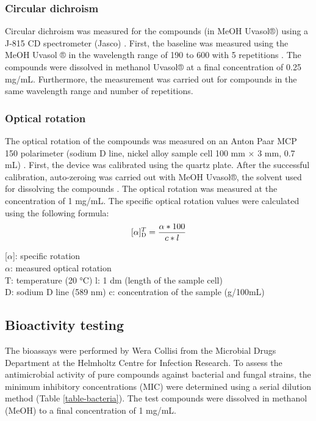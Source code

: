 \subsubsection{Circular dichroism}
Circular dichroism was measured for the compounds (in MeOH Uvasol®) using a J-815 CD spectrometer (Jasco) \cite{Rita2023}. First, the baseline was measured using the MeOH Uvasol ® in the wavelength range of 190 to 600 with 5 repetitions \cite{Ellens}. The compounds were dissolved in methanol Uvasol® at a final concentration of 0.25 mg/mL. Furthermore, the measurement was carried out for compounds in the same wavelength range and number of repetitions.

\subsubsection{Optical rotation}
The optical rotation of the compounds was measured on an Anton Paar MCP 150 polarimeter (sodium D line, nickel alloy sample cell 100 mm × 3 mm, 0.7 mL) \cite{Rita2023}. First, the device was calibrated using the quartz plate. After the successful calibration, auto-zeroing was carried out with MeOH Uvasol®, the solvent used for dissolving the compounds \cite{Ellens}. The optical rotation was measured at the concentration of 1 mg/mL. The specific optical rotation values were calculated using the following formula:\[[\alpha]^{T}_{\textsc{D}} = \frac{\alpha * 100}{c * l}\] 

[$\alpha$]: specific rotation\\
$\alpha$: measured optical rotation\\
T: temperature (20 °C) l: 1 dm (length of the sample cell)\\
D: sodium D line (589 nm) c: concentration of the sample (g/100mL)




\subsection{Bioactivity testing}
The bioassays were performed by Wera Collisi from the Microbial Drugs Department at the Helmholtz Centre for Infection Research. To assess the antimicrobial activity of pure compounds against bacterial and fungal strains, the minimum inhibitory concentrations (MIC) were determined using a serial dilution method (Table \ref{table-bacteria}). The test compounds were dissolved in methanol (MeOH) to a final concentration of 1 mg/mL.\\

